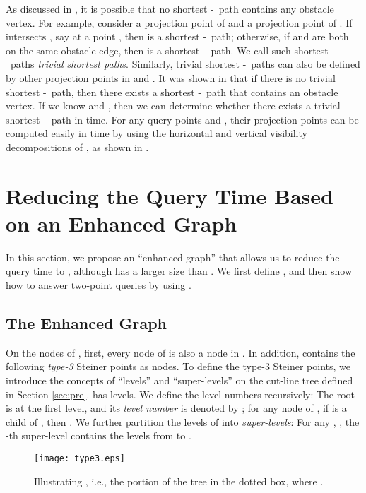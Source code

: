 \documentclass[english,runningheads,11pt]{llncs}
\def\st{-}
\begin{document}
As discussed in \cite{ref:ChenSh00},
it is possible that no shortest \st\ path contains any
obstacle vertex.
For example, consider
a projection point  of  and a projection point  of . If
 intersects , say at a point , then
 is a shortest \st\ path; otherwise, if  and
 are both on the same obstacle edge, then  is a shortest \st\ path. We call
such shortest \st\ paths {\em trivial shortest paths}. Similarly, trivial shortest
\st\ paths can also be defined by other projection points in 
and .
It was shown in \cite{ref:ChenSh00} that if there is no trivial
shortest \st\ path, then there exists a shortest \st\ path that
contains an obstacle vertex. If we know 
and , then we can determine whether there exists
a trivial shortest \st\ path in  time. For any query points  and ,
their projection points can be computed easily in  time by using
the horizontal and vertical visibility decompositions of , as shown in
\cite{ref:ChenSh00}.


\section{Reducing the Query Time Based on an Enhanced Graph}
\label{sec:newgraph}

In this section, we propose an ``enhanced graph''  that allows us to reduce
the query time to , although
 has a larger size than . We
first define , and then show how to answer two-point queries by using .


\subsection{The Enhanced Graph }

On the nodes of , first, every node of  is also a node
in . In addition, 
contains the following {\em type-3} Steiner points as nodes.
To define the type-3 Steiner points, we introduce the concepts of ``levels'' and
``super-levels'' on  the cut-line tree  defined in Section
\ref{sec:pre}.
 has  levels. We
define the level numbers recursively: The root 
is at the first level, and its {\em level number} is denoted by   ;
for any node  of , if  is a child of , then .
We further partition the  levels of  into  {\em super-levels}: For any , , the -th super-level contains the levels from
 to .


\begin{figure}[t]
\begin{minipage}[t]{\linewidth}
\begin{center}
\texttt{[image: type3.eps]}
\caption{\footnotesize Illustrating , i.e., the portion of the tree in the dotted box, where . }
\label{fig:type3}
\end{center}
\end{minipage}
\vspace*{-0.15in}
\end{figure}
\end{document}
